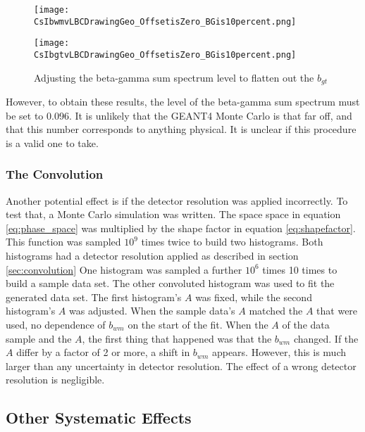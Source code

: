 \documentclass[main.tex]{subfiles}
\begin{document}
\begin{figure}
    \centering
    \begin{minipage}{0.50\textwidth}
        \centerline{\texttt{[image: CsIbwmvLBCDrawingGeo\_OffsetisZero\_BGis10percent.png]}}
    \end{minipage}\hfill
    \begin{minipage}{0.50\textwidth}
        \centerline{\texttt{[image: CsIbgtvLBCDrawingGeo\_OffsetisZero\_BGis10percent.png]}}
    \end{minipage}
    \caption{Adjusting the beta-gamma sum spectrum level to flatten out the $b_{gt}$}
    \label{fig:dataoffset0BG10per}
\end{figure}

However, to obtain these results, the level of the beta-gamma sum spectrum must be set to 0.096. 
It is unlikely that the GEANT4 Monte Carlo is that far off, and that this number corresponds to anything physical.
It is unclear if this procedure is a valid one to take.

\subsubsection{The Convolution}

Another potential effect is if the detector resolution was applied incorrectly.
To test that, a Monte Carlo simulation was written.
The space space in equation \ref{eq:phase_space} was multiplied by the shape factor in equation \ref{eq:shapefactor}.
This function was sampled $10^{9}$ times twice to build two histograms. 
Both histograms had a detector resolution applied as described in section \ref{sec:convolution}
One histogram was sampled a further $10^{6}$ times 10 times to build a sample data set.
The other convoluted histogram was used to fit the generated data set.
The first histogram's $A$ was fixed, while the second histogram's $A$ was adjusted.
When the sample data's $A$ matched the $A$ that were used, no dependence of $b_{wm}$ on the start of the fit.
When the $A$ of the data sample and the $A$, the first thing that happened was that the $b_{wm}$ changed.
If the $A$ differ by a factor of 2 or more, a shift in $b_{wm}$ appears.
However, this is much larger than any uncertainty in detector resolution.
The effect of a wrong detector resolution is negligible. 

\subsection{Other Systematic Effects}
\end{document}
